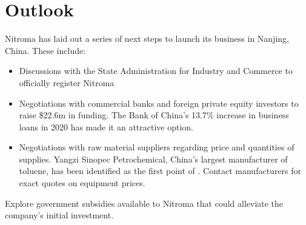 \section{Outlook}
Nitroma has laid out a series of next steps to launch its business in Nanjing, China. These include:
\begin{itemize}
    \item Discussions with the State Administration for Industry and Commerce to officially register Nitroma 
    \item Negotiations with commercial banks and foreign private equity investors to raise \$22.6m in funding. The Bank of China’s 13.7\% increase in business loans in 2020 has made it an attractive option. 
    \item Negotiations with raw material suppliers regarding price and quantities of supplies. Yangzi Sinopec Petrochemical, China’s largest manufacturer of toluene, has been identified as the first point of \contact\cite{sinopec_group_sinopec_2014}.
    Contact manufacturers for exact quotes on equipment prices.
\end{itemize}



Explore government subsidies available to Nitroma that could alleviate the company’s initial investment. 
